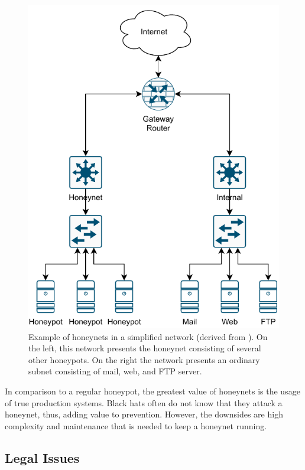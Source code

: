 \begin{figure}[ht]
    \centering
    \includegraphics{figures/honeynet-example.pdf}
    \caption[Example of honeynets in a simplified network]{
        Example of honeynets in a simplified network (derived from \cite{Spitzner2003}).
        On the left, this network presents the honeynet consisting of several other honeypots.
        On the right the network presents an ordinary subnet consisting of mail, web, and FTP server.
    }
    \label{fig:honeynet-example}
\end{figure}

In comparison to a regular honeypot, the greatest value of honeynets is the usage of true production systems.
Black hats often do not know that they attack a honeynet, thus, adding value to prevention.
However, the downsides are high complexity and maintenance that is needed to keep a honeynet running. \cite{Spitzner2003}

\subsection{Legal Issues}


